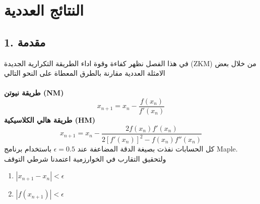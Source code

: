 \chapter{النتائج العددية}

\section*{1. مقدمة}
في هذا الفصل نظهر كفاءة وقوة اداء الطريقة التكرارية الجديدة (ZKM) من خلال بعض الامثلة العددية مقارنة بالطرق المعطاة على النحو التالي\\ \\
\textbf{طريقة نيوتن (NM)}
\[
x_{n+1} = x_n - \frac{f(x_n)}{f'(x_n)}
\]
\textbf{طريقة هالي الكلاسيكية (HM)}
\[
x_{n+1} = x_n - \frac{2f(x_n) f'(x_n)}{2[f'(x_n)]^2 - f(x_n )f''(x_n)}
\]
كل الحسابات نفذت بصيغة الدقة المضاعفة عند $\epsilon = 0.5$ باستخدام برنامج Maple. ولتحقيق التقارب في الخوارزمية اعتمدنا شرطي التوقف
\begin{enumerate}
	\item $|x_{n+1}-x_n|<\epsilon$
	\item $|f(x_{n+1})|<\epsilon$
\end{enumerate}
\newpage

		\renewcommand{\arraystretch}{2}

